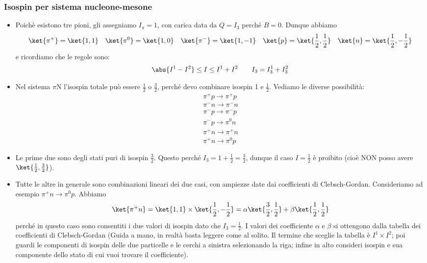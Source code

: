 \subsubsection{Isospin per sistema nucleone-mesone}
\begin{itemize}
    \item Poichè esistono tre pioni, gli assegniamo $I_\pi=1$, con carica data da $Q=I_3$ perché $B=0$. Dunque abbiamo
    \begin{equation*}
        \ket{\pi^+}=\ket{1,1}\quad\ket{\pi^0}=\ket{1,0}\quad\ket{\pi^-}=\ket{1,-1}\quad\ket{p}=\ket{\frac12,\frac12}\quad\ket{n}=\ket{\frac12,-\frac12}
    \end{equation*}
    e ricordiamo che le regole sono:
    \begin{equation*}
        \abs{I^1-I^2}\leq I\leq I^1+I^2\qquad I_3=I_3^1+I_3^2
    \end{equation*}
    \item Nel sistema $\pi$N l'isospin totale può essere $\frac12$ o $\frac32$, perché devo combinare isospin 1 e $\frac12$. Vediamo le diverse possibilità:
    \begin{gather*}
        \pi^+p\to\pi^+p\\
        \pi^-n\to\pi^-n\\
        \pi^-p\to\pi^-p\\
        \pi^-p\to\pi^0n\\
        \pi^+n\to\pi^+n\\
        \pi^+n\to\pi^0p
    \end{gather*}
    \item Le prime due sono degli stati puri di isospin $\frac32$. Questo perché $I_3=1+\frac12=\frac32$, dunque il caso $I=\frac12$ è proibito (cioè NON posso avere $\ket{\frac12,\frac32}$).
    \item Tutte le altre in generale sono combinazioni lineari dei due casi, con ampiezze date dai coefficienti di Clebsch-Gordan. Consideriamo ad esempio $\pi^+n\to\pi^0p$. Abbiamo 
    \begin{equation*}
        \ket{\pi^+n}=\ket{1,1}\times\ket{\frac12,-\frac12}=\alpha\ket{\frac32,\frac12}+\beta\ket{\frac12,\frac12}
    \end{equation*}
    perché in questo caso sono consentiti i due valori di isospin dato che $I_3=\frac12$. I valori dei coefficiente $\alpha$ e $\beta$ si ottengono dalla tabella dei coefficienti di Clebsch-Gordan (Guida a mano, in realtà basta leggere come al solito. Il termine che sceglie la tabella è $I^1\times I^2$; poi guardi le componenti di isospin delle due particelle e le cerchi a sinistra selezionando la riga; infine in alto consideri isospin e sua componente dello stato di cui vuoi trovare il coefficiente).
\end{itemize}
